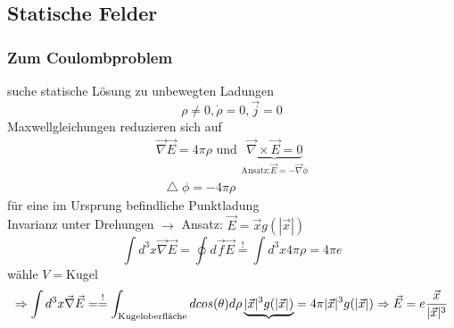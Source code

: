 \documentclass[a4paper]{article}
\newcommand*\laplace{\mathop{}\!\mathbin\bigtriangleup}
\begin{document}
\subsection{Statische Felder}
\subsubsection{Zum Coulombproblem}
suche statische Lösung zu unbewegten Ladungen
\begin{equation}
\rho\neq0,\dot{\rho}=0,\vec{j}=0
\end{equation}
Maxwellgleichungen reduzieren sich auf 
\begin{align}
\vec{\nabla}\vec{E}=4\pi\rho \text{ und }
\underbrace{\vec{\nabla}\times\vec{E}=0}_{\text{Ansatz:}
\vec{E}=-\vec{\nabla}\phi}\\
\laplace\phi=-4\pi\rho
\end{align}
für eine im Ursprung befindliche Punktladung\\
Invarianz unter Drehungen $\rightarrow$ Ansatz: $\vec{E}=\vec{x}g(|\vec{x}|)$
\begin{equation}
\int d^3x \vec{\nabla}\vec{E}=\oint d\vec{f} \vec{E} \overset{!}{=}  \int
d^3x4\pi\rho=4\pi e
\end{equation} 
wähle $V=$Kugel 
\begin{equation}
\Rightarrow \int d^3x
\vec{\nabla}\vec{E}=\overset{!}{=}\int_\text{Kugeloberfläche} dcos(\theta)d\rho
\underbrace{|\vec{x}|^3 g(|\vec{x}|)}=4\pi|\vec{x}|^3 g(|\vec{x}|)\\
\Rightarrow \vec{E}=e\frac{\vec{x}}{|\vec{x}|^3}
\end{equation}
\end{document}
